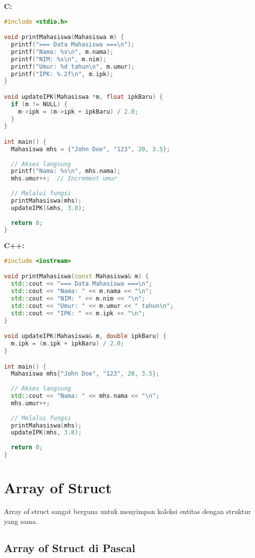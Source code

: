 \documentclass[../main.tex]{subfiles}
\begin{document}
\textbf{C:}
\begin{lstlisting}[language=C, caption={Akses field di C}]
#include <stdio.h>

void printMahasiswa(Mahasiswa m) {
  printf("=== Data Mahasiswa ===\n");
  printf("Nama: %s\n", m.nama);
  printf("NIM: %s\n", m.nim);
  printf("Umur: %d tahun\n", m.umur);
  printf("IPK: %.2f\n", m.ipk);
}

void updateIPK(Mahasiswa *m, float ipkBaru) {
  if (m != NULL) {
    m->ipk = (m->ipk + ipkBaru) / 2.0;
  }
}

int main() {
  Mahasiswa mhs = {"John Doe", "123", 20, 3.5};
  
  // Akses langsung
  printf("Nama: %s\n", mhs.nama);
  mhs.umur++;  // Increment umur
  
  // Melalui fungsi
  printMahasiswa(mhs);
  updateIPK(&mhs, 3.8);
  
  return 0;
}
\end{lstlisting}

\textbf{C++:}
\begin{lstlisting}[language=C++, caption={Akses field di C++}]
#include <iostream>

void printMahasiswa(const Mahasiswa& m) {
  std::cout << "=== Data Mahasiswa ===\n";
  std::cout << "Nama: " << m.nama << "\n";
  std::cout << "NIM: " << m.nim << "\n";
  std::cout << "Umur: " << m.umur << " tahun\n";
  std::cout << "IPK: " << m.ipk << "\n";
}

void updateIPK(Mahasiswa& m, double ipkBaru) {
  m.ipk = (m.ipk + ipkBaru) / 2.0;
}

int main() {
  Mahasiswa mhs{"John Doe", "123", 20, 3.5};
  
  // Akses langsung
  std::cout << "Nama: " << mhs.nama << "\n";
  mhs.umur++;
  
  // Melalui fungsi
  printMahasiswa(mhs);
  updateIPK(mhs, 3.8);
  
  return 0;
}
\end{lstlisting}

\section{Array of Struct}

Array of struct sangat berguna untuk menyimpan koleksi entitas dengan struktur yang sama.

\subsection{Array of Struct di Pascal}
\end{document}
